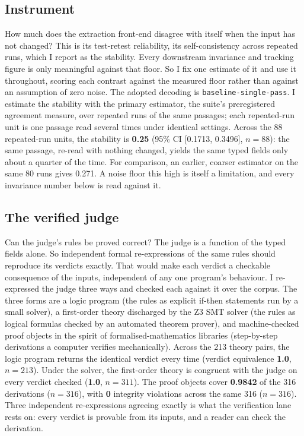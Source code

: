 \documentclass[11pt]{article}
\begin{document}
\subsection{Instrument}
How much does the extraction front-end disagree with itself when the input has not changed? This is its
test-retest reliability, its self-consistency across repeated runs, which I report as the stability. Every
downstream invariance and tracking figure is only meaningful against that floor. So I fix one estimate of
it and use it throughout, scoring each contrast against the measured floor rather than against an
assumption of zero noise. The adopted decoding is \texttt{baseline-single-pass}. I estimate the stability
with the primary estimator, the suite's preregistered agreement measure, over repeated runs of the same
passages; each repeated-run unit is one passage read several times under identical settings. Across the 88
repeated-run units, the
stability is \textbf{0.25} (95\% CI [0.1713, 0.3496], $n = 88$): the same passage, re-read with nothing
changed, yields the same typed fields only about a quarter of the time. For comparison, an earlier, coarser
estimator on the same 80 runs gives 0.271. A noise floor this high is itself a limitation, and every
invariance number below is read against it.

\subsection{The verified judge}
Can the judge's rules be proved correct? The judge is a function of the typed fields
alone. So independent formal re-expressions of the same rules should reproduce its verdicts exactly. That would
make each verdict a checkable consequence of the inputs, independent of any one program's behaviour. I
re-expressed the judge three ways and checked each against it over the corpus. The three forms are a logic
program (the rules as explicit if-then statements run by a small solver), a first-order theory discharged
by the Z3 SMT solver \cite{z3} (the rules as logical formulas checked by an automated theorem prover), and
machine-checked proof objects
in the spirit of formalised-mathematics libraries \cite{mathlib} (step-by-step derivations a computer
verifies mechanically). Across the 213 theory pairs, the logic
program
returns the identical verdict every time (verdict equivalence \textbf{1.0}, $n = 213$). Under the solver,
the first-order theory is congruent with the judge on every verdict checked (\textbf{1.0}, $n = 311$). The
proof objects cover \textbf{0.9842} of the 316 derivations ($n = 316$), with \textbf{0} integrity
violations across the same 316 ($n = 316$). Three independent re-expressions agreeing exactly is what the
verification lane rests on: every verdict is provable from its inputs, and a reader can check the
derivation.
\end{document}
